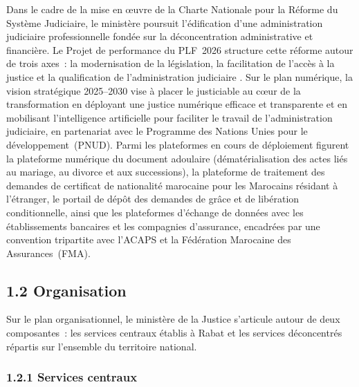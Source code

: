 Dans le cadre de la mise en \oe{}uvre de la Charte Nationale pour la Réforme du Système Judiciaire, le ministère poursuit l’édification d’une administration judiciaire professionnelle fondée sur la déconcentration administrative et financière. Le Projet de performance du PLF~2026 structure cette réforme autour de trois axes~: la modernisation de la législation, la facilitation de l’accès à la justice et la qualification de l’administration judiciaire \citep{MJNumerique2026}. Sur le plan numérique, la vision stratégique 2025--2030 vise à placer le justiciable au c\oe{}ur de la transformation en déployant une justice numérique efficace et transparente et en mobilisant l’intelligence artificielle pour faciliter le travail de l’administration judiciaire, en partenariat avec le Programme des Nations Unies pour le développement~(PNUD). Parmi les plateformes en cours de déploiement figurent la plateforme numérique du document adoulaire (dématérialisation des actes liés au mariage, au divorce et aux successions), la plateforme de traitement des demandes de certificat de nationalité marocaine pour les Marocains résidant à l’étranger, le portail de dépôt des demandes de grâce et de libération conditionnelle, ainsi que les plateformes d’échange de données avec les établissements bancaires et les compagnies d’assurance, encadrées par une convention tripartite avec l’ACAPS et la Fédération Marocaine des Assurances~(FMA).



\subsection*{1.2 \quad Organisation}

Sur le plan organisationnel, le minist\`ere de la Justice s'articule autour de deux composantes~: les services centraux \'etablis \`a Rabat et les services d\'econcentr\'es r\'epartis sur l'ensemble du territoire national.

\subsubsection*{1.2.1 \quad Services centraux}


